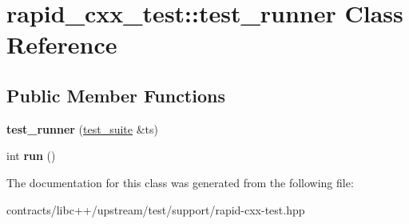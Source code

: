 \hypertarget{classrapid__cxx__test_1_1test__runner}{}\section{rapid\+\_\+cxx\+\_\+test\+:\+:test\+\_\+runner Class Reference}
\label{classrapid__cxx__test_1_1test__runner}
\subsection*{Public Member Functions}
\begin{DoxyCompactItemize}
\item 
\mbox{\label{classrapid__cxx__test_1_1test__runner_a2ae5e198031a27cf4c5c121fecf12195}} 
{\bfseries test\+\_\+runner} (\mbox{\hyperlink{classrapid__cxx__test_1_1test__suite}{test\+\_\+suite}} \&ts)
\item 
\mbox{\label{classrapid__cxx__test_1_1test__runner_a579e058204e02dd3136c8f87675976bd}} 
int {\bfseries run} ()
\end{DoxyCompactItemize}


The documentation for this class was generated from the following file\+:\begin{DoxyCompactItemize}
\item 
contracts/libc++/upstream/test/support/rapid-\/cxx-\/test.\+hpp\end{DoxyCompactItemize}
